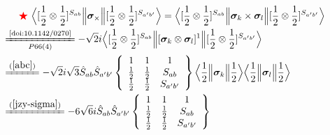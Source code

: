 \documentclass[master]{shnuthesis}
\newcommand{\ap}{a^\prime}
\newcommand{\bp}{b^\prime}
\newcommand{\il}{\!\!\!\!\!\!\!\!\!\!}
\newcommand{\zdydh}{\xlongequal}
\newcommand{\redstar}{{\color{red} \bigstar}\,\,}
\begin{document}
\begin{align}
    & \redstar \Big\langle [\frac{1}{2}\otimes\frac{1}{2}]^{S_{ab}} \Big\| \bm{\sigma}_\times \Big\| [\frac{1}{2}\otimes\frac{1}{2}]^{S_{\ap\bp}} \Big\rangle = \Big\langle [\frac{1}{2}\otimes\frac{1}{2}]^{S_{ab}} \Big\| \bm{\sigma}_k \times \bm{\sigma}_l \Big\| [\frac{1}{2}\otimes\frac{1}{2}]^{S_{\ap\bp}} \Big\rangle \notag\\
    &\il \zdydh[P66(4)]{\text{\cite{doi:10.1142/0270}}} -\sqrt{2}i \Big\langle [\frac{1}{2}\otimes\frac{1}{2}]^{S_{ab}} \Big\| [\bm{\sigma}_k \otimes \bm{\sigma}_l]^1 \Big\| [\frac{1}{2}\otimes\frac{1}{2}]^{S_{\ap\bp}} \Big\rangle \\
    &\il \zdydh{(\ref{abc})} -\sqrt{2}i \sqrt{3}\hat{S}_{ab}\hat{S}_{\ap\bp}  \left\{\begin{array}{ccc} 1 & 1 & 1 \\ \frac{1}{2} & \frac{1}{2} & S_{ab} \\ \frac{1}{2} & \frac{1}{2} & S_{\ap\bp} \end{array}\right\}  \Big\langle \frac{1}{2} \Big\| \bm{\sigma}_k \Big\| \frac{1}{2} \Big\rangle \Big\langle \frac{1}{2} \Big\| \bm{\sigma}_l \Big\| \frac{1}{2} \Big\rangle \\
    &\il \zdydh{(\ref{jzy-sigma})} -6\sqrt{6}i \hat{S}_{ab}\hat{S}_{\ap\bp}  \left\{\begin{array}{ccc} 1 & 1 & 1 \\ \frac{1}{2} & \frac{1}{2} & S_{ab} \\ \frac{1}{2} & \frac{1}{2} & S_{\ap\bp} \end{array}\right\} \label{sigma-cha}
\end{align}
\end{document}
